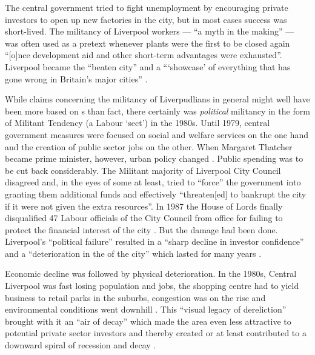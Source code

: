 The central government tried to fight unemployment by encouraging private investors to open up new factories in the city, but in most cases success was short-lived.
The militancy of Liverpool workers --- ``a myth in the making'' --- was often used as a pretext whenever  plants were the first to be closed again ``[o]nce development aid and other short-term advantages were exhausted''\citep[cf.][52]{belchem2006a}.
Liverpool became the ``beaten city'' and a ```showcase' of everything that has gone wrong in Britain's major cities'' \citep[\emph{Daily Mirror}, 11 October 1982, cited in][52--53]{belchem2006a}.

While claims concerning the militancy of Liverpudlians in general might well have been more based on s than fact, there certainly was \emph{political} militancy in the form of Militant Tendency (a Labour `sect') in the 1980s.
Until 1979, central government measures were focused on social and welfare services on the one hand and the creation of public sector jobs on the other. When Margaret Thatcher became prime minister, however, urban policy changed \citep[cf.][19]{juddparkinson1990a}.
Public spending was to be cut back considerably.
The Militant majority of Liverpool City Council disagreed and, in the eyes of some at least, tried to \enquote{force} the government into granting them additional funds and effectively ``threaten[ed] to bankrupt the city if it were not given the extra resources''.
In 1987 the House of Lords finally disqualified 47 Labour officials of the City Council from office for failing to protect the financial interest of the city \citep[cf.][249--250]{parkinson1990}.
But the damage had been done.
Liverpool's ``political failure'' \citep[241]{parkinson1990} resulted in a ``sharp decline in investor confidence'' and a ``deterioration in the  of the city'' which lasted for many years \citep[172]{couch2003a}.

Economic decline was followed by physical deterioration.
In the 1980s, Central Liverpool was fast losing population and jobs, the shopping centre had to yield business to retail parks in the suburbs, congestion was on the rise and environmental conditions went downhill \citep[cf.][38]{couch2003}.
This ``visual legacy of dereliction'' brought with it an ``air of decay'' which made the area even less attractive to potential private sector investors and thereby created or at least contributed to a downward spiral of recession and decay \citep[21]{fraser2003}.

